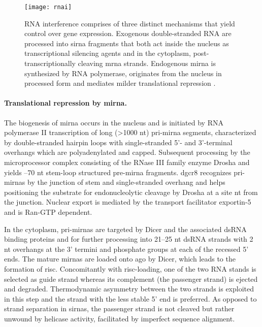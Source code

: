 \begin{figure}[t]
  \centering
  \texttt{[image: rnai]}
  \caption[The three major pathways of RNA interference.]{RNA interference comprises of three distinct mechanisms that yield control over gene expression. Exogenous double-stranded RNA are processed into \gls{sirna} fragments that both act inside the nucleus as transcriptional silencing agents and in the cytoplasm, post-transcriptionally cleaving \gls{mrna} strands. Endogenous \gls{mirna} is synthesized by RNA polymerase, originates from the nucleus in processed form and mediates milder translational repression \citep{Kim2007}.}
  \label{fig:rnai}
\end{figure}

\paragraph{Translational repression by \gls{mirna}.}
The biogenesis of \gls{mirna} occurs in the nucleus and is initiated by RNA polymerase II transcription of long (\textgreater 1000 nt) \gls{pri-mirna} segments, characterized by double-stranded hairpin loops with single-stranded 5'- and 3'-terminal overhangs which are polyadenylated and capped. Subsequent processing by the microprocessor complex consisting of the RNase III family enzyme Drosha and  yields --70 nt stem-loop structured \gls{pre-mirna} fragments. \gls{dgcr8} recognizes \glspl{pri-mirna} by the junction of stem and single-stranded overhang and helps positioning the substrate for endonucleolytic cleavage by Drosha at a site  nt from the junction. Nuclear export is mediated by the transport facilitator exportin-5 and is Ran-GTP dependent.

In the cytoplasm, \glspl{pri-mirna} are targeted by Dicer and the associated dsRNA binding proteins  and  for further processing into 21--25 nt dsRNA strands with 2 nt overhangs at the 3' termini and phosphate groups at each of the recessed 5' ends. The mature \glspl{mirna} are loaded onto \gls{ago} by Dicer, which leads to the formation of \gls{risc}. Concomitantly with \gls{risc}-loading, one of the two RNA stands is selected as guide strand whereas its complement (the passenger strand) is ejected and degraded. Thermodynamic asymmetry between the two strands is exploited in this step and the strand with the less stable 5' end is preferred. As opposed to strand separation in \glspl{sirna}, the passenger strand is not cleaved but rather unwound by helicase activity, facilitated by imperfect sequence alignment.

